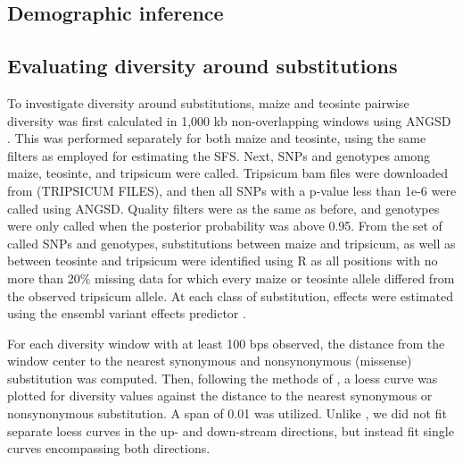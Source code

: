 \documentclass{pnastwo}
\begin{document}
\begin{article}
\begin{materials}
\subsection{Demographic inference}

\subsection{Evaluating diversity around substitutions}
To investigate diversity around substitutions, maize and teosinte pairwise diversity was first
calculated in 1,000 kb non-overlapping windows using ANGSD
\cite{angsd}. This was performed separately for both maize and
teosinte, using the same filters as employed for estimating the
SFS. Next, SNPs and genotypes among maize, teosinte, and tripsicum were called. Tripsicum bam files
were downloaded from (TRIPSICUM FILES), and then all SNPs with a
p-value less than 1e-6 were called using ANGSD. Quality filters were
as the same as before, and genotypes were only called when the
posterior probability was above 0.95. From the set of called SNPs and
genotypes, substitutions between maize and tripsicum, as well as
between teosinte and tripsicum were identified using R \cite{R} as all positions with
no more than 20\% missing data for which every maize or teosinte
allele differed from the observed tripsicum allele. At each class of
substitution, effects were estimated using the ensembl variant effects
predictor \cite{vep}.

For each diversity window with at least 100 bps observed, the distance from the window center to the
nearest synonymous and nonsynonymous (missense) substitution was
computed. Then, following the methods of \cite{hernandez11}, a loess
curve was plotted for diversity values against the distance to the
nearest synonymous or nonsynonymous substitution. A span of 0.01 was
utilized. Unlike
\cite{sattath11}, we did not fit separate loess curves in the up- and
down-stream directions, but instead fit single curves encompassing
both directions.


\end{materials}
\end{article}
\end{document}
